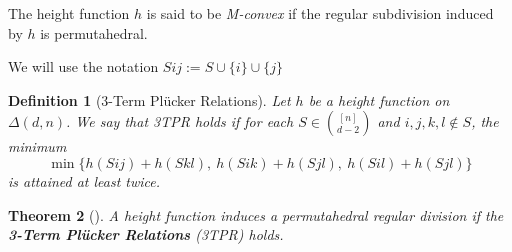 \documentclass[leqno]{article}
\numberwithin{equation}{section}
\newtheorem{theorem}{Theorem}
\numberwithin{theorem}{section}
\newtheorem{definition}[theorem]{Definition}
\begin{document}
The height function $h$ is said to be \textit{M-convex} if the regular subdivision induced by $h$ is permutahedral.

We will use the notation $Sij := S\cup \{i\}\cup \{j\}$

\begin{definition}[3-Term Plücker Relations] Let $h $ be a height function on $\Delta(d, n)$.
We say that 3TPR holds if for each $S\in \binom{[n]}{ d-2}$ and $i, j, k, l \not\in S$, the minimum
\[
\min \Big\{h(Sij) + h(Skl), \ h(Sik) + h(Sjl),\  h(Sil) +  h(Sjl)\Big\}
\] 
is attained at least twice.
\end{definition}

\begin{theorem}[] A height function induces a permutahedral regular division if the \textbf{3-Term Plücker Relations} (3TPR) holds.
\end{theorem}
\end{document}
